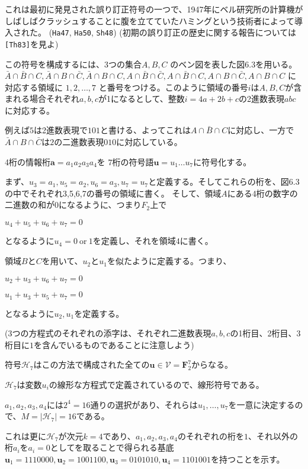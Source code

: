\documentclass[12pt,a4paper]{article}
\begin{document}
これは最初に発見された誤り訂正符号の一つで、1947年にベル研究所の計算機がしばしばクラッシュすることに腹を立てていたハミングという技術者によって導入された。 (\texttt{Ha47},
\texttt{Ha50}, \texttt{Sh48})
(初期の誤り訂正の歴史に関する報告については\texttt{[Th83]}を見よ)

この符号を構成するには、\(3\)つの集合\(A,B,C\)
のベン図を表した図6.3を用いる。\(\bar A \cap \bar B \cap C, \bar A \cap B \cap \bar C, \bar A \cap B \cap C, A \cap \bar B \cap \bar C, A \cap \bar B \cap C, A \cap B \cap \bar C, A \cap B \cap C\)
に対応する領域に \(1, 2, \dots , 7\)
と番号をつける。このように領域の番号\(i\)は\(A,B,C\)が含まれる場合それぞれ\(a, b, c\)が1になるとして、整数\(i = 4 a + 2 b + c\)の2進数表現\(abc\)に対応する。

例えば\(5\)は2進数表現で\(101\)と書ける、よってこれは\(A \cap \bar B \cap C\)に対応し、一方で\(\bar A \cap B \cap \bar C\)は\(2\)の二進数表現\(010\)に対応している。

4桁の情報桁\(\mathbf{a} = a_1 a_2 a_3 a_4\)を
\(7\)桁の符号語\(\mathbf{u} = u_1 \dots u_7\)に符号化する。

まず、\(u_3 = a_1, u_5 = a_2, u_6 = a_3, u_7 = u_7\)と定義する。そしてこれらの桁を、図6.3の中でそれぞれ3,5,6,7の番号の領域に書く。
そして、領域\(A\)にある4桁の数字の二進数の和が\(0\)になるように、つまり\(F_2\)上で

\(u_4 + u_5 + u_ 6 + u_7 = 0\)

となるように\(u_4 = 0 \ \text{or} \  1\)を定義し、それを領域\(4\)に書く。

領域\(B\)と\(C\)を用いて、\(u_2\)と\(u_1\)を似たように定義する。つまり、

\(u_2 + u_3 + u_6 + u_7 = 0\)

\(u_1 + u_3 + u_5 + u_7 = 0\)

となるように\(u_2, u_1\)を定義する。

(3つの方程式のそれぞれの添字は、それぞれ二進数表現\(a,b,c\)の1桁目、2桁目、3桁目に\(1\)を含んでいるものであることに注意しよう)

符号\(\mathcal{H}_7\)はこの方法で構成された全ての\(\mathbf{u} \in \mathcal{V} = \mathbf{F}_2^7\)からなる。

\(\mathcal{H}_7\)は変数\(u_i\)の線形な方程式で定義されているので、線形符号である。

\(a_1, a_2, a_3, a_4\)には\(2^4 = 16\)通りの選択があり、それらは\(u_1, \dots ,u_7\)を一意に決定するので、\(M = \mid \mathcal{H}_7 \mid = 16\)である。

これは更に\(\mathcal{H}_7\)が次元\(k = 4\)であり、\(a_1, a_2, a_3, a_4\)のそれぞれの桁を\(1\)、それ以外の桁\(a_i\)を\(a_i = 0\)としてを取ることで得られる基底
\(\mathbf{u}_1 = 1110000, \mathbf{u}_2 = 1001100, \mathbf{u}_3 = 0101010, \mathbf{u}_4 = 1101001\)を持つことを示す。
\end{document}
